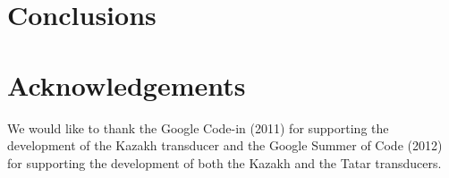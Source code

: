 \documentclass[a4paper,11pt,twocolumn]{article}
\begin{document}

\section{Conclusions}

\section*{Acknowledgements}

We would like to thank the Google Code-in (2011) for supporting the development 
of the Kazakh transducer and the Google Summer of Code (2012) for supporting the 
development of both the Kazakh and the Tatar transducers. 



\end{document}
